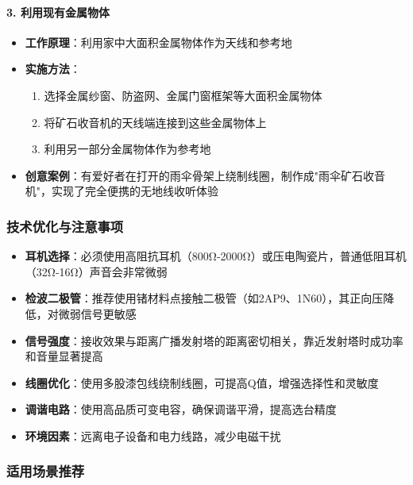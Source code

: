 \documentclass[12pt,UTF8]{ctexbook}
\begin{document}
\paragraph{3. 利用现有金属物体}
\begin{itemize}[leftmargin=3.5em]
    \item \textbf{工作原理}：利用家中大面积金属物体作为天线和参考地
    \item \textbf{实施方法}：
        \begin{enumerate}
            \item 选择金属纱窗、防盗网、金属门窗框架等大面积金属物体
            \item 将矿石收音机的天线端连接到这些金属物体上
            \item 利用另一部分金属物体作为参考地
        \end{enumerate}
    \item \textbf{创意案例}：有爱好者在打开的雨伞骨架上绕制线圈，制作成"雨伞矿石收音机"，实现了完全便携的无地线收听体验
\end{itemize}

\subsubsection{技术优化与注意事项}

\begin{itemize}[leftmargin=3.5em]
    \item \textbf{耳机选择}：必须使用高阻抗耳机（800Ω-2000Ω）或压电陶瓷片，普通低阻耳机（32Ω-16Ω）声音会非常微弱
    \item \textbf{检波二极管}：推荐使用锗材料点接触二极管（如2AP9、1N60），其正向压降低，对微弱信号更敏感
    \item \textbf{信号强度}：接收效果与距离广播发射塔的距离密切相关，靠近发射塔时成功率和音量显著提高
    \item \textbf{线圈优化}：使用多股漆包线绕制线圈，可提高Q值，增强选择性和灵敏度
    \item \textbf{调谐电路}：使用高品质可变电容，确保调谐平滑，提高选台精度
    \item \textbf{环境因素}：远离电子设备和电力线路，减少电磁干扰
\end{itemize}

\subsubsection{适用场景推荐}
\end{document}
